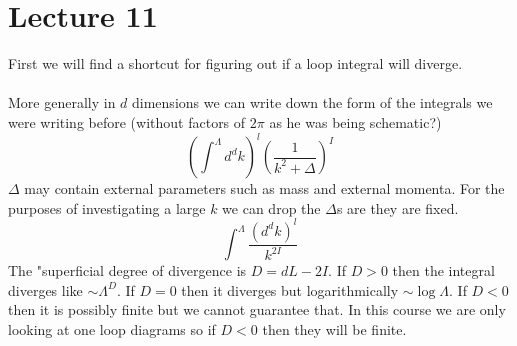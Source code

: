 \documentclass{article}
\begin{document}
\section{Lecture 11}
First we will find a shortcut for figuring out if a loop integral will diverge.\\\\
More generally in $d$ dimensions we can write down the form of the integrals we were writing before (without factors of $2\pi$ as he was being schematic?)
$$
(\int^{\Lambda} d^d k)^l ( \frac{1}{k^2 + \Delta})^I
$$
$\Delta$ may contain external parameters such as mass and external momenta. For the purposes of investigating a large $k$ we can drop the $\Delta$s are they are fixed.
$$
\int^{\Lambda} \frac{(d^d k)^l}{k^{2I}}
$$
The "superficial degree of divergence is $D= dL - 2I$. If $D>0$ then the integral diverges like $\sim \Lambda^D$. If $D=0$ then it diverges but logarithmically $\sim \log \Lambda$. If $D<0$ then it is possibly finite but we cannot guarantee that. In this course we are only looking at one loop diagrams so if $D<0$ then they will be finite.
\end{document}
